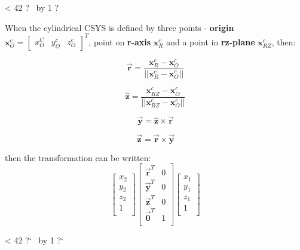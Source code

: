 \documentclass[10pt,b5paper,titlepage]{book}
\newcommand{\m}{\mathbf}
\newcommand{\repeatit}[3][10]{%
    \myloopcounter1%
    \loop\ifnum\myloopcounter < #1
    #2#3%
    \advance\myloopcounter by 1%
    \repeat%
    #2%
}
\newenvironment{qbox}
{
\begin{center}
    \repeatit[42]{?}{\ }
\end{center}
}
{
\begin{center}
    \repeatit[42]{?`}{\ }
\end{center}
}
\begin{document}
\begin{qbox}
\begin{enumerate}
            When the cylindrical CSYS is defined by three points - \textbf{origin}
             $ \m{x}_O^c = \begin{bmatrix} x_O^C & y_O^c & z_O^c \end{bmatrix}^T $,
             point on \textbf{r-axis} $ \m{x}_{R}^c $
            and a point in \textbf{rz-plane} $ \m{x}_{RZ}^c $, then:

            \begin{equation}
                \vec{\m{r}} = \frac{\m{x}_R^c - \m{x}_O^c}{||\m{x}_R^c - \m{x}_O^c||}
            \end{equation}

            \begin{equation}
                \hat{\m{z}} = \frac{\m{x}_{RZ}^c - \m{x}_O^c}{||\m{x}_{RZ}^c - \m{x}_O^c||}
            \end{equation}

            \begin{equation}
                \vec{\m{y}} = \hat{\m{z}} \times \vec{\m{r}}
            \end{equation}

            \begin{equation}
                \vec{\m{z}} = \vec{\m{r}} \times \vec{\m{y}}
            \end{equation}

            then the transformation can be written:
            \begin{equation}
                \begin{bmatrix}
                    x_2 \\
                    y_2 \\
                    z_2 \\
                    1 \\
                \end{bmatrix}
                \begin{bmatrix}
                    \vec{\m{r}}^T & 0 \\
                    \vec{\m{y}}^T & 0 \\
                    \vec{\m{z}}^T & 0 \\
                    \vec{\m{0}}^T & 1 \\
                \end{bmatrix}
                \begin{bmatrix}
                    x_1 \\
                    y_1 \\
                    z_1 \\
                    1 \\
                \end{bmatrix}
            \end{equation}


\end{enumerate}
\end{qbox}
\end{document}

